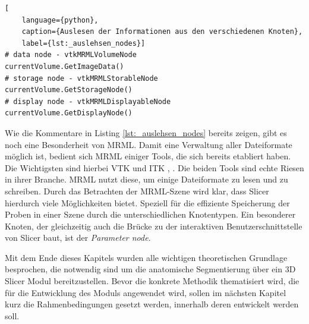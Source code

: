 \begin{lstlisting}[
	language={python},
	caption={Auslesen der Informationen aus den verschiedenen Knoten},
	label={lst:_auslehsen_nodes}]
# data node - vtkMRMLVolumeNode
currentVolume.GetImageData()
# storage node - vtkMRMLStorableNode
currentVolume.GetStorageNode()
# display node - vtkMRMLDisplayableNode
currentVolume.GetDisplayNode()
\end{lstlisting}

Wie die Kommentare in Listing \ref{lst:_auslehsen_nodes} bereits zeigen, gibt es
noch eine Besonderheit von \ac{MRML}. Damit eine Verwaltung aller Dateiformate
möglich ist, bedient sich \ac{MRML} einiger Tools, die sich bereits etabliert haben.
Die Wichtigsten sind hierbei \ac{VTK} und \ac{ITK} \citep[vgl.][K.~1.1]{vtk2006},
\citep[vgl.][K.~1.1]{itkguide2015}. Die beiden Tools sind echte Riesen in ihrer
Branche. \ac{MRML} nutzt diese, um einige Dateiformate zu lesen und zu schreiben.
Durch das Betrachten der \ac{MRML}-Szene wird klar, dass Slicer hierdurch viele
Möglichkeiten bietet. Speziell für die effiziente Speicherung der Proben in einer
Szene durch die unterschiedlichen Knotentypen. Ein besonderer Knoten, der gleichzeitig
auch die Brücke zu der interaktiven Benutzerschnittstelle von Slicer baut, ist
der \textit{Parameter node}.

Mit dem Ende dieses Kapitels wurden alle wichtigen theoretischen Grundlage besprochen,
die notwendig sind um die anatomische Segmentierung über ein 3D Slicer Modul
bereitzustellen. Bevor die konkrete Methodik thematisiert wird, die für die
Entwicklung des Moduls angewendet wird, sollen im nächsten Kapitel kurz die Rahmenbedingungen
gesetzt werden, innerhalb deren entwickelt werden soll.
